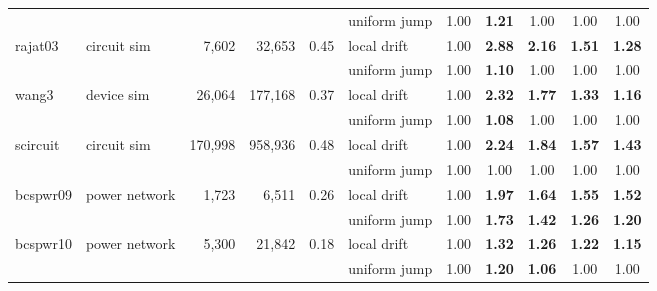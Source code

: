 \begin{tabular}{llrrrlccccc}
 &  &  &  &  & uniform jump & 1.00 & \textbf{1.21} & 1.00 & 1.00 & 1.00 \\
rajat03 & circuit sim & 7,602 & 32,653 & 0.45 & local drift & 1.00 & \textbf{2.88} & \textbf{2.16} & \textbf{1.51} & \textbf{1.28} \\
 &  &  &  &  & uniform jump & 1.00 & \textbf{1.10} & 1.00 & 1.00 & 1.00 \\
wang3 & device sim & 26,064 & 177,168 & 0.37 & local drift & 1.00 & \textbf{2.32} & \textbf{1.77} & \textbf{1.33} & \textbf{1.16} \\
 &  &  &  &  & uniform jump & 1.00 & \textbf{1.08} & 1.00 & 1.00 & 1.00 \\
scircuit & circuit sim & 170,998 & 958,936 & 0.48 & local drift & 1.00 & \textbf{2.24} & \textbf{1.84} & \textbf{1.57} & \textbf{1.43} \\
 &  &  &  &  & uniform jump & 1.00 & 1.00 & 1.00 & 1.00 & 1.00 \\
bcspwr09 & power network & 1,723 & 6,511 & 0.26 & local drift & 1.00 & \textbf{1.97} & \textbf{1.64} & \textbf{1.55} & \textbf{1.52} \\
 &  &  &  &  & uniform jump & 1.00 & \textbf{1.73} & \textbf{1.42} & \textbf{1.26} & \textbf{1.20} \\
bcspwr10 & power network & 5,300 & 21,842 & 0.18 & local drift & 1.00 & \textbf{1.32} & \textbf{1.26} & \textbf{1.22} & \textbf{1.15} \\
 &  &  &  &  & uniform jump & 1.00 & \textbf{1.20} & \textbf{1.06} & 1.00 & 1.00 \\
\bottomrule
\end{tabular}

